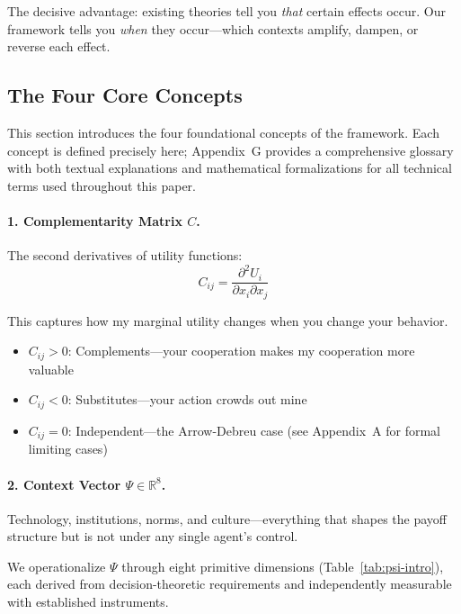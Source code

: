 The decisive advantage: existing theories tell you \emph{that} certain effects occur. Our framework tells you \emph{when} they occur---which contexts amplify, dampen, or reverse each effect.

\subsection{The Four Core Concepts}
\label{sec:intro-concepts}

This section introduces the four foundational concepts of the framework. Each concept is defined precisely here; Appendix~G provides a comprehensive glossary with both textual explanations and mathematical formalizations for all technical terms used throughout this paper.

\paragraph{1. Complementarity Matrix $C$.}
The second derivatives of utility functions:
\begin{equation}
  C_{ij} = \frac{\partial^2 U_i}{\partial x_i \partial x_j}
\end{equation}

This captures how my marginal utility changes when you change your behavior.
\begin{itemize}
  \item $C_{ij} > 0$: Complements---your cooperation makes my cooperation more valuable
  \item $C_{ij} < 0$: Substitutes---your action crowds out mine
  \item $C_{ij} = 0$: Independent---the Arrow-Debreu case (see Appendix~A for formal limiting cases)
\end{itemize}

\paragraph{2. Context Vector $\Psi \in \mathbb{R}^8$.}
Technology, institutions, norms, and culture---everything that shapes the payoff structure but is not under any single agent's control.

We operationalize $\Psi$ through eight primitive dimensions (Table~\ref{tab:psi-intro}), each derived from decision-theoretic requirements and independently measurable with established instruments.

